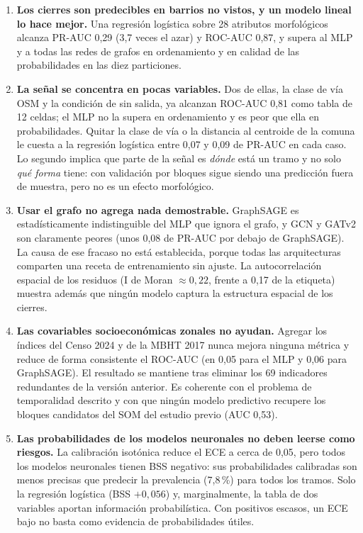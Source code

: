 \documentclass[11pt,a4paper]{article}
\begin{document}
\begin{enumerate}[leftmargin=*]
  \item \textbf{Los cierres son predecibles en barrios no vistos, y un modelo lineal lo hace mejor.}
    Una regresión logística sobre 28 atributos morfológicos alcanza PR-AUC 0,29 (3,7 veces el azar)
    y ROC-AUC 0,87, y supera al MLP y a todas las redes de grafos en ordenamiento y en calidad de
    las probabilidades en las diez particiones.

  \item \textbf{La señal se concentra en pocas variables.} Dos de ellas, la clase de vía OSM y la
    condición de sin salida, ya alcanzan ROC-AUC 0,81 como tabla de 12 celdas; el MLP no la supera
    en ordenamiento y es peor que ella en probabilidades. Quitar la clase de vía o la distancia al
    centroide de la comuna le cuesta a la regresión logística entre 0,07 y 0,09 de PR-AUC en cada
    caso. Lo segundo implica que parte de la señal es \emph{dónde} está un tramo y no solo
    \emph{qué forma} tiene: con validación por bloques sigue siendo una predicción fuera de muestra,
    pero no es un efecto morfológico.

  \item \textbf{Usar el grafo no agrega nada demostrable.} GraphSAGE es estadísticamente
    indistinguible del MLP que ignora el grafo, y GCN y GATv2 son claramente peores (unos 0,08 de
    PR-AUC por debajo de GraphSAGE). La causa de ese fracaso no está establecida, porque todas las
    arquitecturas comparten una receta de entrenamiento sin ajuste. La autocorrelación espacial de
    los residuos (I de Moran $\approx 0{,}22$, frente a 0,17 de la etiqueta) muestra además que
    ningún modelo captura la estructura espacial de los cierres.

  \item \textbf{Las covariables socioeconómicas zonales no ayudan.} Agregar los índices del Censo
    2024 y de la MBHT 2017 nunca mejora ninguna métrica y reduce de forma consistente el ROC-AUC
    (en 0,05 para el MLP y 0,06 para GraphSAGE). El resultado se mantiene tras eliminar los 69
    indicadores redundantes de la versión anterior. Es coherente con el problema de temporalidad
    descrito y con que ningún modelo predictivo recupere los bloques candidatos del SOM del
    estudio previo (AUC 0,53).

  \item \textbf{Las probabilidades de los modelos neuronales no deben leerse como riesgos.} La
    calibración isotónica reduce el ECE a cerca de 0,05, pero todos los modelos neuronales tienen
    BSS negativo: sus probabilidades calibradas son menos precisas que predecir la prevalencia
    (7,8\,\%) para todos los tramos. Solo la regresión logística (BSS $+0{,}056$) y, marginalmente,
    la tabla de dos variables aportan información probabilística. Con positivos escasos, un ECE
    bajo no basta como evidencia de probabilidades útiles.


\end{enumerate}
\end{document}
